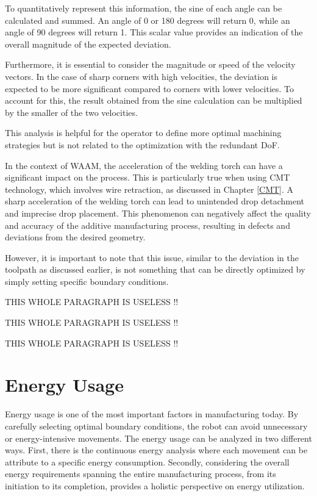 To quantitatively represent this information, the sine of each angle can be calculated and summed. An angle of 0 or 180 degrees will return 0, while an angle of 90 degrees will return 1. This scalar value provides an indication of the overall magnitude of the expected deviation.

Furthermore, it is essential to consider the magnitude or speed of the velocity vectors. In the case of sharp corners with high velocities, the deviation is expected to be more significant compared to corners with lower velocities. To account for this, the result obtained from the sine calculation can be multiplied by the smaller of the two velocities.

This analysis is helpful for the operator to define more optimal machining strategies but is not related to the optimization with the redundant DoF.

In the context of WAAM, the acceleration of the welding torch can have a significant impact on the process. This is particularly true when using CMT technology, which involves wire retraction, as discussed in Chapter \ref{CMT}. A sharp acceleration of the welding torch can lead to unintended drop detachment and imprecise drop placement. This phenomenon can negatively affect the quality and accuracy of the additive manufacturing process, resulting in defects and deviations from the desired geometry.

However, it is important to note that this issue, similar to the deviation in the toolpath as discussed earlier, is not something that can be directly optimized by simply setting specific boundary conditions. 


THIS WHOLE PARAGRAPH IS USELESS !!


THIS WHOLE PARAGRAPH IS USELESS !!


THIS WHOLE PARAGRAPH IS USELESS !!



\section{Energy Usage}
Energy usage is one of the most important factors in manufacturing today. By carefully selecting optimal boundary conditions, the robot can avoid unnecessary or energy-intensive movements. The energy usage can be analyzed in two different ways. First, there is the continuous energy analysis where each movement can be attribute to a specific energy consumption. Secondly, considering the overall energy requirements spanning the entire manufacturing process, from its initiation to its completion, provides a holistic perspective on energy utilization. 
